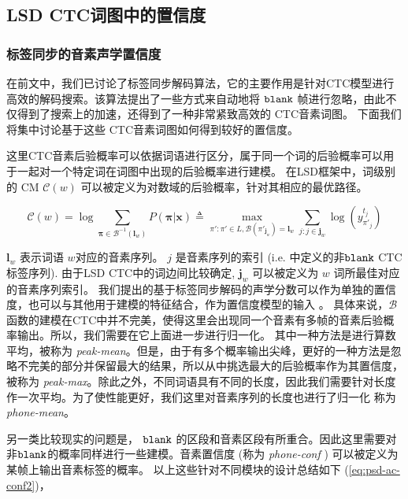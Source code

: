 \subsection{LSD CTC词图中的置信度}
\label{sec:pp-conf-measure}


\subsubsection{标签同步的音素声学置信度}
\label{sec:psd-ac-conf}

在前文中，我们已讨论了标签同步解码算法，它的主要作用是针对CTC模型进行高效的解码搜索。该算法提出了一些方式来自动地将 $\tt blank$ 帧进行忽略，由此不仅得到了搜索上的加速，还得到了一种非常紧致高效的 CTC音素词图。
下面我们将集中讨论基于这些 CTC音素词图如何得到较好的置信度。

这里CTC音素后验概率可以依据词语进行区分，属于同一个词的后验概率可以用于一起对一个特定词在词图中出现的后验概率进行建模。
在LSD框架中，词级别的 CM $\mathcal{C}(w)$ 可以被定义为对数域的后验概率，针对其相应的最优路径。


     \begin{equation}\label{eq:psd-ac-conf1}
        \mathcal{C}(w)  =
         \log\!\!\!\!\!\!\sum_{\bm\pi \in \mathcal{B}^{-1}(\mathbf{l}_w)}{\!\!\!\!\!\!P(\bm\pi|\mathbf{x})}
        \triangleq
   \!\!\!\!\!\!\mathop{\max}\limits
       _{\!\!\!\!\pi':\pi' \in L, \mathcal{B}(\pi'_{\mathbf{j}_w})       =       {\mathbf{l}}_w}
   \sum_{j:j\in \mathbf{j}_w}
   \log({y^{t_{j}}_{\pi'_{j}}})
     \end{equation}

$\mathbf{l}_{w}$ 表示词语  $w$对应的音素序列。
$j$ 是音素序列的索引 (i.e.  \cite{zhc00-chen-tasl2017}中定义的非$\tt blank$ CTC 标签序列).
由于LSD CTC中的词边间比较确定, $\mathbf{j}_w$ 可以被定义为 $w$ 词所最佳对应的音素序列索引。
我们提出的基于标签同步解码的声学分数可以作为单独的置信度，也可以与其他用于建模的特征结合，作为置信度模型的输入 \cite{yu2011calibration}。 
具体来说，$\mathcal{B}$函数的建模在CTC中并不完美，使得这里会出现同一个音素有多帧的音素后验概率输出。所以，我们需要在它上面进一步进行归一化。 其中一种方法是进行算数平均，被称为 {\em peak-mean}。但是，由于有多个概率输出尖峰，更好的一种方法是忽略不完美的部分并保留最大的结果，所以从中挑选最大的后验概率作为其置信度，被称为 {\em peak-max}。除此之外，不同词语具有不同的长度，因此我们需要针对长度作一次平均。为了使性能更好，我们这里对音素序列的长度也进行了归一化 称为{\em phone-mean}。

另一类比较现实的问题是， {$\tt blank$} 的区段和音素区段有所重合。因此这里需要对非$\tt blank$的概率同样进行一些建模。音素置信度 (称为 {\em phone-conf }) 可以被定义为某帧上输出音素标签的概率。
以上这些针对不同模块的设计总结如下 (\ref{eq:psd-ac-conf2})，


